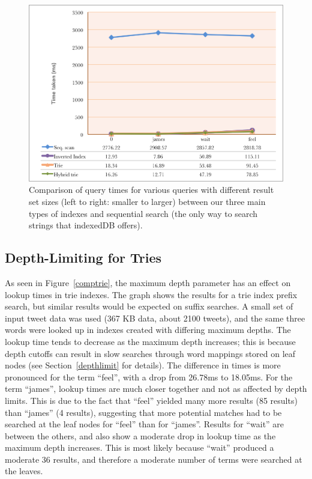 \documentclass{vldb}
\begin{document}
\begin{figure}
   \includegraphics[scale=.53]{query-times}
  \caption{Comparison of query times for various queries with different result set sizes (left to right: smaller to larger) between our three main types of indexes and sequential search (the only way to search strings that indexedDB offers). }
\end{figure}

\subsection{Depth-Limiting for Tries}
As seen in Figure~\ref{comptrie}, the maximum depth parameter has an effect on lookup times in trie indexes. The graph shows the results for a trie index prefix search, but similar results would be expected on suffix searches. A small set of input tweet data was used (367 KB data, about 2100 tweets), and the same three words were looked up in indexes created with differing maximum depths. The lookup time tends to decrease as the maximum depth increases; this is because depth cutoffs can result in slow searches through word mappings stored on leaf nodes (see Section~\ref{depthlimit} for details). The difference in times is more pronounced for the term ``feel'', with a drop from 26.78ms to 18.05ms. For the term ``james'', lookup times are much closer together and not as affected by depth limits. This is due to the fact that ``feel'' yielded many more results (85 results) than ``james'' (4 results), suggesting that more potential matches had to be searched at the leaf nodes for ``feel'' than for ``james''. Results for ``wait'' are between the others, and also show a moderate drop in lookup time as the maximum depth increases. This is most likely because ``wait'' produced a moderate 36 results, and therefore a moderate number of terms were searched at the leaves.
\end{document}
